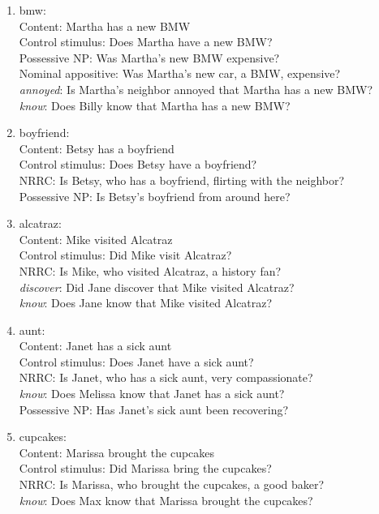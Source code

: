 \documentclass[11pt,fleqn]{article}
\newcommand{\6}{\mbox{$[\hspace*{-.6mm}[$}}
\newcommand{\9}{\mbox{$]\hspace*{-.6mm}]$}}
\begin{document}
\begin{itemize}
\begin{enumerate}
\item bmw:  \\
     Content: Martha has a new BMW\\
     Control stimulus: Does Martha have a new BMW?\\
     Possessive NP: Was Martha's new BMW expensive?\\
     Nominal appositive: Was Martha's new car, a BMW, expensive?\\
     {\em annoyed}: Is Martha's neighbor annoyed that Martha has a new BMW?\\
     {\em know}: Does Billy know that Martha has a new BMW?

\item boyfriend:  \\
     Content: Betsy has a boyfriend\\
     Control stimulus: Does Betsy have a boyfriend?\\
     NRRC: Is Betsy, who has a boyfriend, flirting with the neighbor?\\
     Possessive NP: Is Betsy's boyfriend from around here?

\item alcatraz:  \\
     Content: Mike visited Alcatraz\\
     Control stimulus: Did Mike visit Alcatraz?\\
     NRRC: Is Mike, who visited Alcatraz, a history fan?\\
     {\em discover}: Did Jane discover that Mike visited Alcatraz?\\
     {\em know}: Does Jane know that Mike visited Alcatraz?

\item aunt:  \\
     Content: Janet has a sick aunt\\
     Control stimulus: Does Janet have a sick aunt?\\
     NRRC: Is Janet, who has a sick aunt, very compassionate?\\
     {\em know}: Does Melissa know that Janet has a sick aunt?\\
     Possessive NP: Has Janet's sick aunt been recovering?

\item cupcakes:  \\
     Content: Marissa brought the cupcakes\\
     Control stimulus: Did Marissa bring the cupcakes?\\
     NRRC: Is Marissa, who brought the cupcakes, a good baker?\\
     {\em know}: Does Max know that Marissa brought the cupcakes?


\end{enumerate}
\end{itemize}
\end{document}
